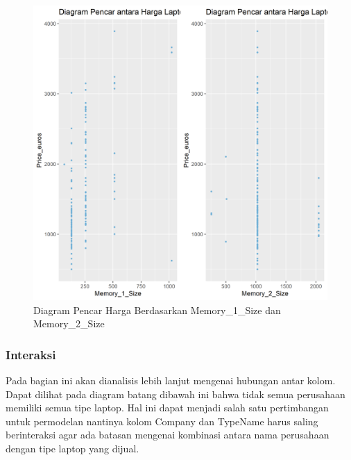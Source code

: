 \documentclass[12pt]{article}
\begin{document}
  
\begin{figure}[h!]
    \centering
    \includegraphics[scale = 0.4]{scatter_price0.png}
    \caption{Diagram Pencar Harga Berdasarkan Memory\_1\_Size dan Memory\_2\_Size}
    \label{Resol}
\end{figure}

\subsubsection{Interaksi}
Pada bagian ini akan dianalisis lebih lanjut mengenai hubungan antar kolom. Dapat dilihat pada diagram batang dibawah ini bahwa tidak semua perusahaan memiliki semua tipe laptop. Hal ini dapat menjadi salah satu pertimbangan untuk permodelan nantinya kolom Company dan TypeName harus saling berinteraksi agar ada batasan mengenai kombinasi antara nama perusahaan dengan tipe laptop yang dijual.    
  
\end{document}
